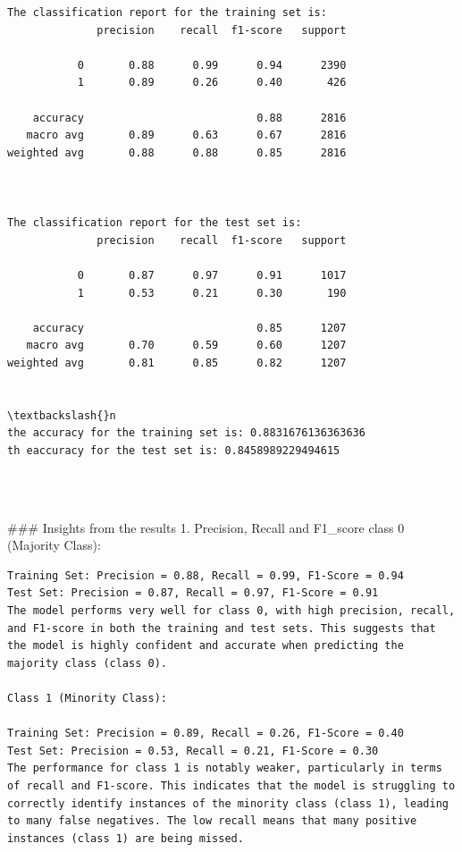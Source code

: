 \documentclass[11pt]{article}
\begin{document}
    \begin{Verbatim}[commandchars=\\\{\}]
The classification report for the training set is:
              precision    recall  f1-score   support

           0       0.88      0.99      0.94      2390
           1       0.89      0.26      0.40       426

    accuracy                           0.88      2816
   macro avg       0.89      0.63      0.67      2816
weighted avg       0.88      0.88      0.85      2816



The classification report for the test set is:
              precision    recall  f1-score   support

           0       0.87      0.97      0.91      1017
           1       0.53      0.21      0.30       190

    accuracy                           0.85      1207
   macro avg       0.70      0.59      0.60      1207
weighted avg       0.81      0.85      0.82      1207


\textbackslash{}n
the accuracy for the training set is: 0.8831676136363636
th eaccuracy for the test set is: 0.8458989229494615


    \end{Verbatim}

    \begin{center}
    \end{center}
    { \hspace*{\fill} \\}
    
    \#\#\# Insights from the results 1. Precision, Recall and F1\_score
class 0 (Majority Class):

\begin{verbatim}
Training Set: Precision = 0.88, Recall = 0.99, F1-Score = 0.94
Test Set: Precision = 0.87, Recall = 0.97, F1-Score = 0.91
The model performs very well for class 0, with high precision, recall, and F1-score in both the training and test sets. This suggests that the model is highly confident and accurate when predicting the majority class (class 0).

Class 1 (Minority Class):

Training Set: Precision = 0.89, Recall = 0.26, F1-Score = 0.40
Test Set: Precision = 0.53, Recall = 0.21, F1-Score = 0.30
The performance for class 1 is notably weaker, particularly in terms of recall and F1-score. This indicates that the model is struggling to correctly identify instances of the minority class (class 1), leading to many false negatives. The low recall means that many positive instances (class 1) are being missed.
\end{verbatim}
\end{document}

